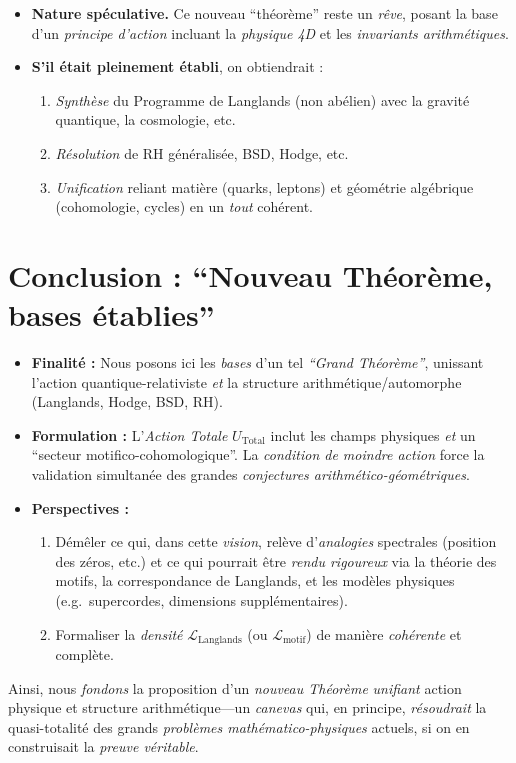 \documentclass[11pt]{article}
\begin{document}
\begin{itemize}
  \item \textbf{Nature spéculative.} Ce nouveau “théorème” reste un \emph{rêve}, posant la base d'un \emph{principe d'action} incluant la \emph{physique 4D} et les \emph{invariants arithmétiques}.
  \item \textbf{S'il était pleinement établi}, on obtiendrait :
  \begin{enumerate}
    \item \emph{Synthèse} du Programme de Langlands (non abélien) avec la gravité quantique, la cosmologie, etc.
    \item \emph{Résolution} de RH généralisée, BSD, Hodge, etc.
    \item \emph{Unification} reliant matière (quarks, leptons) et géométrie algébrique (cohomologie, cycles) en un \emph{tout} cohérent.
  \end{enumerate}
\end{itemize}

\section*{Conclusion : “Nouveau Théorème, bases établies”}

\begin{itemize}
  \item \textbf{Finalité :} Nous posons ici les \emph{bases} d'un tel \emph{“Grand Théorème”}, unissant l'action quantique-relativiste \emph{et} la structure arithmétique/automorphe (Langlands, Hodge, BSD, RH).
  \item \textbf{Formulation :} L'\emph{Action Totale} $U_{\mathrm{Total}}$ inclut les champs physiques \emph{et} un “secteur motifico-cohomologique”. La \emph{condition de moindre action} force la validation simultanée des grandes \emph{conjectures arithmético-géométriques}.
  \item \textbf{Perspectives :}
    \begin{enumerate}
      \item Démêler ce qui, dans cette \emph{vision}, relève d'\emph{analogies} spectrales (position des zéros, etc.) et ce qui pourrait être \emph{rendu rigoureux} via la théorie des motifs, la correspondance de Langlands, et les modèles physiques (e.g.\ supercordes, dimensions supplémentaires).
      \item Formaliser la \emph{densité} \(\mathcal{L}_{\mathrm{Langlands}}\) (ou \(\mathcal{L}_{\mathrm{motif}}\)) de manière \emph{cohérente} et complète.
    \end{enumerate}
\end{itemize}

\noindent
Ainsi, nous \emph{fondons} la proposition d'un \emph{nouveau Théorème} \emph{unifiant} action physique et structure arithmétique---un \emph{canevas} qui, en principe, \emph{résoudrait} la quasi-totalité des grands \emph{problèmes mathématico-physiques} actuels, si on en construisait la \emph{preuve véritable}.
\end{document}
